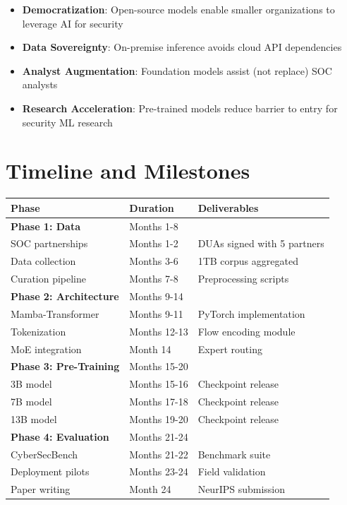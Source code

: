 \documentclass[11pt]{article}
\begin{document}
\begin{itemize}
    \item \textbf{Democratization}: Open-source models enable smaller organizations to leverage AI for security
    \item \textbf{Data Sovereignty}: On-premise inference avoids cloud API dependencies
    \item \textbf{Analyst Augmentation}: Foundation models assist (not replace) SOC analysts
    \item \textbf{Research Acceleration}: Pre-trained models reduce barrier to entry for security ML research
\end{itemize}

\section{Timeline and Milestones}

\begin{table}[h]
\centering
\small
\begin{tabular}{|l|l|l|}
\hline
\textbf{Phase} & \textbf{Duration} & \textbf{Deliverables} \\
\hline
\textbf{Phase 1: Data} & Months 1-8 & \\
\quad SOC partnerships & Months 1-2 & DUAs signed with 5 partners \\
\quad Data collection & Months 3-6 & 1TB corpus aggregated \\
\quad Curation pipeline & Months 7-8 & Preprocessing scripts \\
\hline
\textbf{Phase 2: Architecture} & Months 9-14 & \\
\quad Mamba-Transformer & Months 9-11 & PyTorch implementation \\
\quad Tokenization & Months 12-13 & Flow encoding module \\
\quad MoE integration & Month 14 & Expert routing \\
\hline
\textbf{Phase 3: Pre-Training} & Months 15-20 & \\
\quad 3B model & Months 15-16 & Checkpoint release \\
\quad 7B model & Months 17-18 & Checkpoint release \\
\quad 13B model & Months 19-20 & Checkpoint release \\
\hline
\textbf{Phase 4: Evaluation} & Months 21-24 & \\
\quad CyberSecBench & Months 21-22 & Benchmark suite \\
\quad Deployment pilots & Months 23-24 & Field validation \\
\quad Paper writing & Month 24 & NeurIPS submission \\
\hline
\end{tabular}
\end{table}
\end{document}
